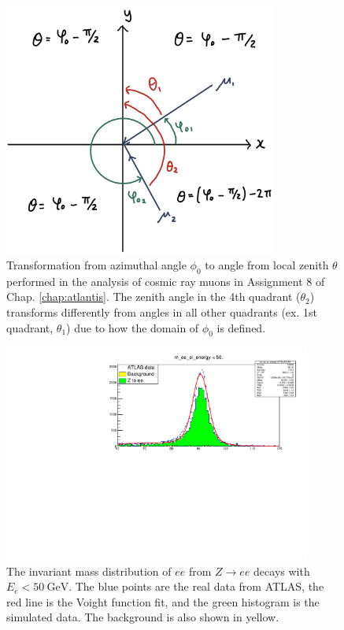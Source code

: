 \documentclass[a4paper]{report}
\numberwithin{equation}{section}
\begin{document}
\begin{figure}[htpb]
    \centering
    \includegraphics[width=0.8\textwidth]{cosmicray_transf_axes.png}
    \caption{Transformation from azimuthal angle $\phi_0$ to angle from local zenith $\theta$ performed in the analysis of 
    cosmic ray muons in Assignment 8 of Chap. \ref{chap:atlantis}. The zenith angle in the 4th quadrant ($\theta_2$) transforms 
    differently from angles in all other quadrants (ex. 1st quadrant, $\theta_1$) due to how the domain of $\phi_0$ is defined.}
    \label{fig:cr_transf_axes}
\end{figure}

\begin{figure}[htpb]
    \centering
    \includegraphics[width=0.9\textwidth]{zeefit_elen50.pdf}
    \caption{The invariant mass distribution of $ee$ from $Z \rightarrow ee$ decays with $E_e < \SI{50}{\giga\electronvolt}$. The blue points are the 
    real data from ATLAS, the red line is the Voight function fit, and the green histogram is the simulated data. The background 
    is also shown in yellow.}
    \label{fig:zee_calib_en50}
\end{figure}
\end{document}
